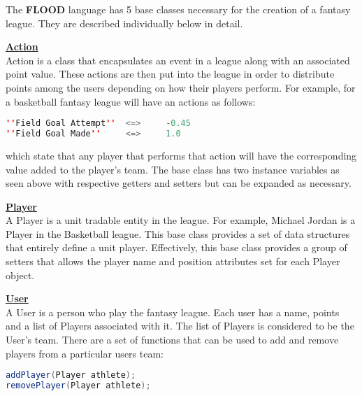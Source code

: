 \documentclass[12pt]{report}
\begin{document}
\begin{doublespace}
The \textbf{FLOOD} language has 5 base classes necessary for the creation of a fantasy league. They are described individually below in detail.
\end{doublespace}

\begin{doublespace}
\textbf{\underline{Action}}
\\
Action is a class that encapsulates an event in a league along with an associated point value. These actions are then put into the league in order to distribute points among the users depending on how their players perform. For example, for a basketball fantasy league will have an actions as follows:
\end{doublespace}

\begin{lstlisting}[language=Java,label=some-code,caption=Action]
''Field Goal Attempt''	<=>		-0.45
''Field Goal Made''		<=>		1.0
\end{lstlisting}

\begin{doublespace}
which state that any player that performs that action will have the corresponding value added to the player's team. The base class has two instance variables as seen above with respective getters and setters but can be expanded as necessary.

\textbf{\underline{Player}}
\\
A Player is a unit tradable entity in the league. For example, Michael Jordan is a Player in the Basketball league. This base class provides a set of data structures that entirely define a unit player.  Effectively, this base class provides a group of setters that allows the player name and position attributes set for each Player object.

\textbf{\underline{User}}
\\
A User is a person who play the fantasy league. Each user has a name, points and a list of Players associated with it. The list of Players is considered to be the User's team. There are a set of functions that can be used to add and remove players from a particular users team:
\end{doublespace}

\begin{lstlisting}[language=Java,label=some-code,caption=Action]
addPlayer(Player athlete);
removePlayer(Player athlete);
\end{lstlisting}
\end{document}
